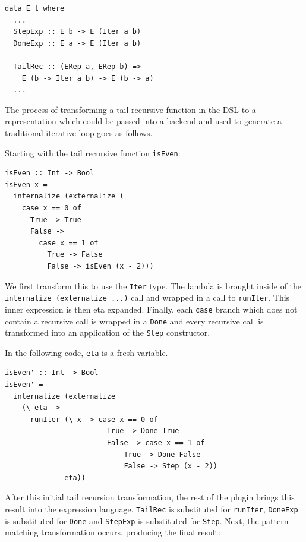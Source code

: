 \documentclass[runningheads, a4paper]{llncs}
\newcommand{\ttt}{\texttt}
\begin{document}
\begin{lstlisting}
data E t where
  ...
  StepExp :: E b -> E (Iter a b)
  DoneExp :: E a -> E (Iter a b)

  TailRec :: (ERep a, ERep b) =>
    E (b -> Iter a b) -> E (b -> a)
  ...
\end{lstlisting}

The process of transforming a tail recursive function in the DSL to a 
representation which could be passed into a backend and used
to generate a traditional iterative loop goes as follows.

Starting with the tail recursive function  \ttt{isEven}:

\begin{lstlisting}
isEven :: Int -> Bool
isEven x =
  internalize (externalize (
    case x == 0 of
      True -> True
      False ->
        case x == 1 of
          True -> False
          False -> isEven (x - 2)))
\end{lstlisting}


We first transform this to use the \verb|Iter| type. The lambda is brought
inside of the \ttt{internalize (externalize ...)} call and wrapped in a call to
\ttt{runIter}. This inner expression is then eta expanded. Finally, each \verb|case|
branch which does not contain a recursive call is wrapped in a \verb|Done| and
every recursive call is transformed into an application of the \verb|Step| constructor.

In the following code, \verb|eta| is a fresh variable.

\begin{lstlisting}
isEven' :: Int -> Bool
isEven' =
  internalize (externalize
    (\ eta ->
      runIter (\ x -> case x == 0 of
                        True -> Done True
                        False -> case x == 1 of
                            True -> Done False
                            False -> Step (x - 2))
              eta))
\end{lstlisting}

After this initial tail recursion transformation, the rest of the plugin brings this
result into the expression language. \verb|TailRec| is substituted for \verb|runIter|,
\verb|DoneExp| is substituted for \verb|Done| and \verb|StepExp| is substituted for \verb|Step|.
Next, the pattern matching transformation occurs, producing the final result:
\end{document}
